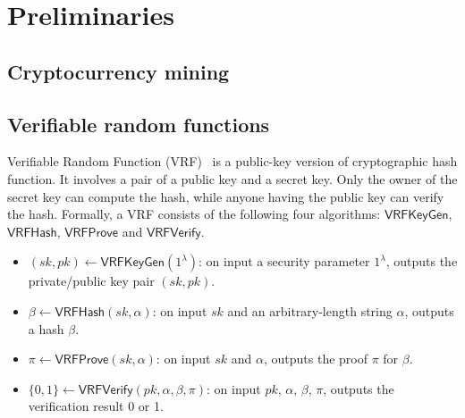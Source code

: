 \section{Preliminaries}

\subsection{Cryptocurrency mining}




\subsection{Verifiable random functions}


Verifiable Random Function (VRF)~\cite{} is a public-key version of cryptographic hash function.
It involves a pair of a public key and a secret key.
Only the owner of the secret key can compute the hash, while anyone having the public key can verify the hash.
Formally, a VRF consists of the following four algorithms: $\mathsf{VRFKeyGen}$, $\mathsf{VRFHash}$, $\mathsf{VRFProve}$ and $\mathsf{VRFVerify}$.

\begin{itemize}
    \item $(sk, pk) \gets \mathsf{VRFKeyGen}(1^{\lambda})$: on input a security parameter $1^{\lambda}$, outputs the private/public key pair $(sk, pk)$.
    \item $\beta \gets \mathsf{VRFHash}(sk, \alpha)$: on input $sk$ and an arbitrary-length string $\alpha$, outputs a hash $\beta$.
    \item $\pi \gets \mathsf{VRFProve}(sk, \alpha)$: on input $sk$ and $\alpha$, outputs the proof $\pi$ for $\beta$.
    \item $\{0, 1\} \gets \mathsf{VRFVerify}(pk, \alpha, \beta, \pi)$: on input $pk$, $\alpha$, $\beta$, $\pi$, outputs the verification result 0 or 1.
\end{itemize}


